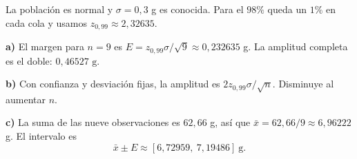 La población es normal y $\sigma=0{,}3$ g es conocida. Para el $98\%$ queda un $1\%$ en cada cola y usamos $z_{0{,}99}\approx2{,}32635$.

\textbf{a)} El margen para $n=9$ es $E=z_{0{,}99}\sigma/\sqrt 9\approx0{,}232635$ g. La amplitud completa es el doble: $\boxed{0{,}46527\text{ g}}$.

\textbf{b)} Con confianza y desviación fijas, la amplitud es $2z_{0{,}99}\sigma/\sqrt n$. Disminuye al aumentar $n$.

\textbf{c)} La suma de las nueve observaciones es $62{,}66$ g, así que $\bar x=62{,}66/9\approx6{,}96222$ g. El intervalo es
\[
\bar x\pm E\approx\boxed{[6{,}72959,\ 7{,}19486]}\ \text{g}.
\]
